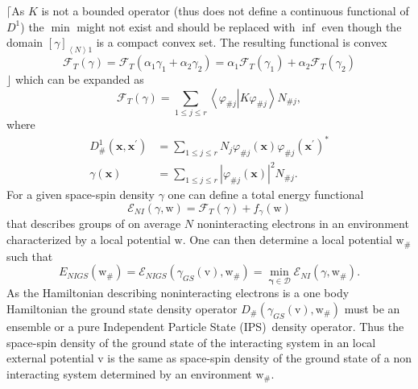 \documentclass[aps,preprint]{revtex4}%
\begin{document}
$\lceil$As $K$ is not a bounded operator (thus does not define a continuous
functional of $D^{1}$) the $\min$ might not exist and should be replaced with
$\inf$ even though the domain $\left[  \gamma\right]  _{\left\langle
N\right\rangle 1}$ is a compact convex set. The resulting functional is
convex
\begin{equation}
\mathcal{F}_{T}\left(  \gamma\right)  =\mathcal{F}_{T}\left(  \alpha_{1}%
\gamma_{1}+\alpha_{2}\gamma_{2}\right)  =\alpha_{1}\mathcal{F}_{T}\left(
\gamma_{1}\right)  +\alpha_{2}\mathcal{F}_{T}\left(  \gamma_{2}\right)
\end{equation}
$\rfloor$ which can be expanded as
\begin{equation}
\mathcal{F}_{T}\left(  \gamma\right)  =\sum_{1\leq j\leq r}\left\langle
\varphi_{\#j}\left\vert K\varphi_{\#j}\right.  \right\rangle N_{\#j},
\end{equation}
where
\begin{align}
D_{\#}^{1}\left(  \mathbf{x,x}^{\prime}\right)   &  =\sum_{1\leq j\leq r}%
N_{j}\varphi_{\#j}\left(  \mathbf{x}\right)  \varphi_{\#j}\left(
\mathbf{x}^{\prime}\right)  ^{\ast}\nonumber\\
\gamma\left(  \mathbf{x}\right)   &  =\sum_{1\leq j\leq r}\left\vert
\varphi_{\#j}\left(  \mathbf{x}\right)  \right\vert ^{2}N_{\#j}.
\label{gammaKS}%
\end{align}
For a given space-spin density $\gamma$ one can define a total energy
functional
\begin{equation}
\mathcal{E}_{NI}\left(  \gamma\mathbf{,}\mathrm{w}\right)  =\mathcal{F}%
_{T}\left(  \gamma\right)  +f_{\gamma}\left(  \mathrm{w}\right)
\end{equation}
that describes groups of on average $N$ noninteracting electrons in an
environment characterized by a local potential $\mathrm{w.}$ One can then
determine a local potential $\mathrm{w}_{\#}$ such that
\begin{equation}
E_{NIGS}\left(  \mathrm{w}_{\#}\right)  =\mathcal{E}_{NIGS}\left(  \gamma
_{GS}\left(  \mathrm{v}\right)  \mathbf{,}\mathrm{w}_{\#}\right)
=\min_{\mathbf{\gamma\in}\mathcal{D}}\mathcal{E}_{NI}\left(  \gamma
\mathbf{,}\mathrm{w}_{\#}\right)  .
\end{equation}
As the Hamiltonian describing noninteracting electrons is a one body
Hamiltonian the ground state density operator $D_{\#}\left(  \gamma
_{GS}\left(  \mathrm{v}\right)  \mathbf{,}\mathrm{w}_{\#}\right)  $ must be an
ensemble or a pure Independent Particle State (IPS)\ density operator. Thus
the space-spin density of the ground state of the interacting system in an
local external potential $\mathrm{v}$ is the same as space-spin density of the
ground state of a non interacting system determined by an environment
$\mathrm{w}_{\#}\mathrm{.}$
\end{document}
